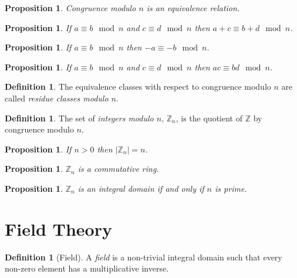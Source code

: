\documentclass{article}
\newtheorem{proposition}[axiom]{Proposition}
\theoremstyle{definition}
\newtheorem{definition}[axiom]{Definition}
\begin{document}
    \begin{proposition}
        Congruence modulo $n$ is an equivalence relation.
    \end{proposition}

    \begin{proposition}
        If $a \equiv b \mod n$ and $c \equiv d \mod n$ then $a + c \equiv b + d \mod n$.
    \end{proposition}

    \begin{proposition}
        If $a \equiv b \mod n$ then $-a \equiv -b \mod n$.
    \end{proposition}

    \begin{proposition}
        If $a \equiv b \mod n$ and $c \equiv d \mod n$ then $ac \equiv bd \mod n$.
    \end{proposition}

    \begin{definition}
        The equivalence classes with respect to congruence modulo $n$ are called \emph{residue classes modulo $n$}.
    \end{definition}

    \begin{definition}
        The set of \emph{integers modulo $n$}, $\mathbb{Z}_n$, is the quotient of $\mathbb{Z}$ by 
        congruence modulo $n$.
    \end{definition}

    \begin{proposition}
        If $n > 0$ then $|\mathbb{Z}_n| = n$.
    \end{proposition}

    \begin{proposition}
        $\mathbb{Z}_n$ is a commutative ring.
    \end{proposition}

    \begin{proposition}
        $\mathbb{Z}_n$ is an integral domain if and only if $n$ is prime.
    \end{proposition}
    \section{Field Theory}

    \begin{definition}[Field]
        A \emph{field} is a non-trivial integral domain such that every non-zero element has a multiplicative
        inverse.
    \end{definition}
\end{document}
